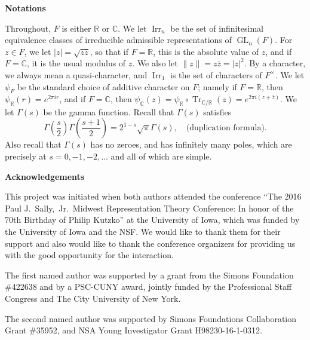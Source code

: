 \documentclass[11pt]{amsart}
\theoremstyle{plain}
\theoremstyle{definition}
\numberwithin{equation}{section}
\newcommand{\C}{\mathbb C}
\newcommand{\R}{\mathbb{R}}
\newcommand{\Irr}{\operatorname{Irr}}
\newcommand{\GL}{\operatorname{GL}}
\begin{document}
\quad

\begin{center}{\bf Notations}\end{center}

Throughout, $F$ is either $\R$ or $\C$. We let $\Irr_n$ be the
set of infinitesimal equivalence classes of irreducible admissible
representations of $\GL_n(F)$. For $z\in F$, we let
$|z|=\sqrt{z\bar{z}}$, so that if $F=\R$, this is the absolute value of
$z$, and if $F=\C$, it is the usual modulus of $z$. We also let
$\|z\|=z\bar{z}=|z|^2$. By a character, we always mean a
quasi-character, and $\Irr_1$ is
the set of characters of $F^\times$. We let $\psi_F$ be the standard
choice of additive character on $F$; namely if $F=\R$, then
$\psi_\R(r)=e^{2\pi i r}$, and if $F=\C$, then
$\psi_\C(z)=\psi_\R\circ\operatorname{Tr}_{\C/\R}(z)=e^{2\pi
  i(z+\bar{z})}$. We let $\Gamma(s)$ be the gamma function. Recall
that $\Gamma(s)$ satisfies
\[
\Gamma\left(\frac{s}{2}\right)\Gamma\left(\frac{s+1}{2}\right)
=2^{1-s}\sqrt{\pi}\Gamma(s),\quad\text{(duplication formula)}.
\]
Also recall that $\Gamma(s)$ has no zeroes, and has infinitely many
poles, which are precisely at $s=0, -1,
-2, \dots$ and all of which are simple.

\quad

\begin{center}{\bf Acknowledgements}\end{center}

This project was initiated when both authors attended the conference
``The 2016 Paul
J.\ Sally,\ Jr.\ Midwest Representation Theory Conference: In honor of
the 70th Birthday of Philip Kutzko'' at the University of Iowa, which
was funded by the University of Iowa and the NSF. We
would like to thank them for their support and also would like to thank the
conference organizers for providing us with the good opportunity for
the interaction. 

The first named author was supported by a grant from the Simons
Foundation \#422638 and by a PSC-CUNY award, jointly funded by the
Professional Staff Congress and The City University of New York.


The second named author was supported by Simons Foundations
Collaboration Grant \#35952, and NSA Young Investigator Grant
H98230-16-1-0312.



\quad



\end{document}
